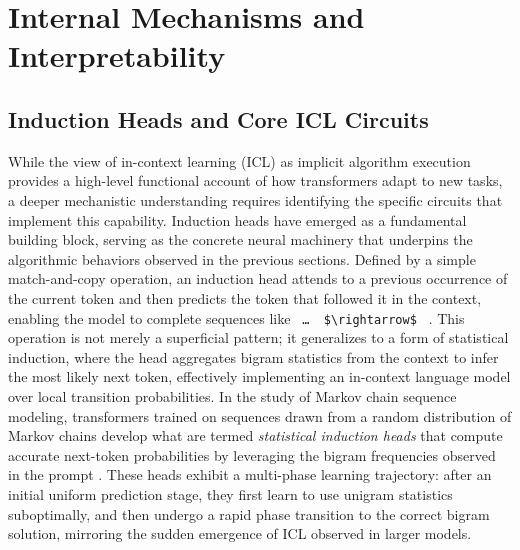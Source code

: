 \documentclass[11pt]{article}
\begin{document}
\section{Internal Mechanisms and Interpretability}

\subsection{Induction Heads and Core ICL Circuits}

While the view of in-context learning (ICL) as implicit algorithm execution provides a high-level functional account of how transformers adapt to new tasks, a deeper mechanistic understanding requires identifying the specific circuits that implement this capability. Induction heads have emerged as a fundamental building block, serving as the concrete neural machinery that underpins the algorithmic behaviors observed in the previous sections. Defined by a simple match-and-copy operation, an induction head attends to a previous occurrence of the current token and then predicts the token that followed it in the context, enabling the model to complete sequences like \texttt{\cite{ref47}\cite{ref48}\ …\ \cite{ref47}\ \$\textbackslash{}rightarrow\$\ \cite{ref48}} \cite{ref49}. This operation is not merely a superficial pattern; it generalizes to a form of statistical induction, where the head aggregates bigram statistics from the context to infer the most likely next token, effectively implementing an in-context language model over local transition probabilities. In the study of Markov chain sequence modeling, transformers trained on sequences drawn from a random distribution of Markov chains develop what are termed \emph{statistical induction heads} that compute accurate next-token probabilities by leveraging the bigram frequencies observed in the prompt \cite{ref50}. These heads exhibit a multi-phase learning trajectory: after an initial uniform prediction stage, they first learn to use unigram statistics suboptimally, and then undergo a rapid phase transition to the correct bigram solution, mirroring the sudden emergence of ICL observed in larger models.
\end{document}
